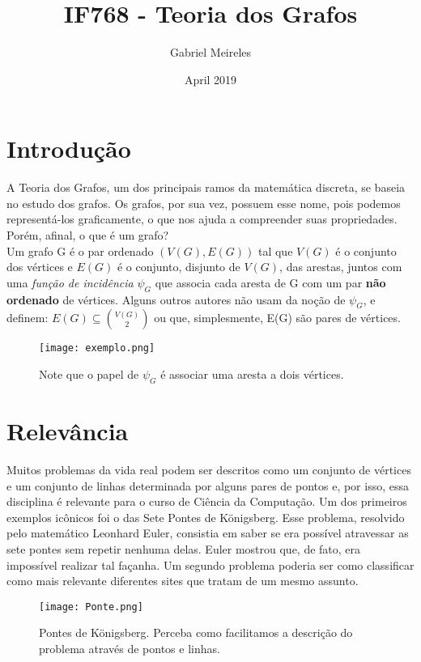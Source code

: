 \documentclass[10pt]{article}
\title{IF768 - Teoria dos Grafos}
\author{Gabriel Meireles}
\date{April 2019}
\begin{document}
\maketitle

\section{Introdução}

A Teoria dos Grafos, um dos principais ramos da matemática discreta, se baseia no estudo dos grafos. Os grafos, por sua vez, possuem esse nome, pois podemos representá-los graficamente,\citep{book:3539} o que nos ajuda a compreender suas propriedades. Porém, afinal, o que é um grafo? \\
\indent Um grafo G é o par ordenado \((V(G), E(G))\) tal que \(V(G)\) é o conjunto dos vértices e \(E(G)\) é o conjunto, disjunto de \(V(G)\), das arestas, juntos com uma \textit{função de incidência} \(\psi_G\) que associa cada aresta de G com um par \textbf{não ordenado} de vértices.\citep{book:3539} Alguns outros autores não usam da noção de \(\psi_G\), e definem: $E(G) \subseteq \binom{V(G)}{2}$\citep{book:3555} ou que, simplesmente, E(G) são pares de vértices.\citep{POTI}
\begin{figure}[h!]
\centering
\texttt{[image: exemplo.png]}\citep{book:3539}
\caption{Note que o papel de \(\psi_G\) é associar uma aresta a dois vértices.}
\label{fig:grafo}
\end{figure}

\section{Relevância}
Muitos problemas da vida real podem ser descritos como um conjunto de vértices e um conjunto de linhas determinada por alguns pares de pontos e, por isso, essa disciplina é relevante para o curso de Ciência da Computação. Um dos primeiros exemplos icônicos foi o das Sete Pontes de Königsberg. Esse problema, resolvido pelo matemático Leonhard Euler, consistia em saber se era possível atravessar as sete pontes sem repetir nenhuma delas. Euler mostrou que, de fato, era impossível realizar tal façanha. Um segundo problema poderia ser como classificar como mais relevante diferentes sites que tratam de um mesmo assunto.\citep{prep}\\
\begin{figure}[h!]
\centering
\texttt{[image: Ponte.png]}\citep{wika}
\caption{Pontes de Königsberg. Perceba como facilitamos a descrição do problema através de pontos e linhas.}
\label{fig:ponte}
\end{figure}
\end{document}
